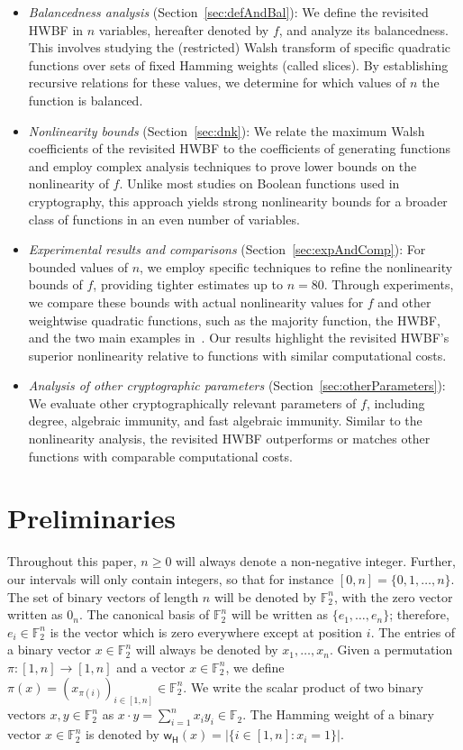 \documentclass[runningheads,orivec]{llncs}
\newcommand{\F}{\mathbb{F}}
\newcommand{\hwbf}{\textsf{HWBF}}
\newcommand{\w}{\mathsf{w_H}}
\let\geq=\geqslant
\begin{document}
    \begin{itemize}
    	\item\emph{Balancedness analysis} (Section~\ref{sec:defAndBal}):
    	We define the revisited \hwbf{} in $n$ variables, hereafter denoted by $f$, and analyze its balancedness. This involves studying the (restricted) Walsh transform of specific quadratic functions over sets of fixed Hamming weights (called slices). By establishing recursive relations for these values, we determine for which values of $n$ the function is balanced.
        \item \emph{Nonlinearity bounds} (Section~\ref{sec:dnk}):
        We relate the maximum Walsh coefficients of the revisited \hwbf{} to the coefficients of generating functions and employ complex analysis techniques to prove lower bounds on the nonlinearity of $f$. Unlike most studies on Boolean functions used in cryptography, this approach yields strong nonlinearity bounds for a broader class of functions in an even number of variables.
        \item \emph{Experimental results and comparisons} (Section~\ref{sec:expAndComp}): 
        For bounded values of $n$, we employ specific techniques to refine the nonlinearity bounds of $f$, providing tighter estimates up to $n = 80$. Through experiments, we compare these bounds with actual nonlinearity values for $f$ and other weightwise quadratic functions, such as the majority function, the \hwbf{}, and the two main examples in~\cite{DAM:MeaOza24}. Our results highlight the revisited \hwbf{}'s superior nonlinearity relative to functions with similar computational costs.
        \item \emph{Analysis of other cryptographic parameters} (Section~\ref{sec:otherParameters}):  
        We evaluate other cryptographically relevant parameters of $f$, including degree, algebraic immunity, and fast algebraic immunity. Similar to the nonlinearity analysis, the revisited \hwbf{} outperforms or matches other functions with comparable computational costs.
    \end{itemize}
    
    \section{Preliminaries}
    
    Throughout this paper, $n\geq 0$ will always denote a non-negative integer. Further, our intervals will only contain integers, so that for instance $[0,n]=\{0,1,\dots,n\}$. The set of binary vectors of length $n$ will be denoted by $\F_2^n$, with the zero vector written as $0_n$. The canonical basis of $\F_2^n$ will be written as $\{e_1,\dots,e_n\}$; therefore, $e_i\in\F_2^n$ is the vector which is zero everywhere except at position $i$. The entries of a binary vector $x\in\F_2^n$ will always be denoted by $x_1,\dots,x_n$. Given a permutation $\pi:[1,n]\to[1,n]$ and a vector $x\in\F_2^n$, we define $\pi(x)=(x_{\pi(i)})_{i\in[1,n]}\in\F_2^n$. We write the scalar product of two binary vectors $x,y\in\F_2^n$ as $x\cdot y=\sum_{i=1}^nx_iy_i\in\F_2$. The Hamming weight of a binary vector $x\in\F_2^n$ is denoted by $\w(x)=|\{i\in [1,n]:x_i=1\}|$.
    
\end{document}
